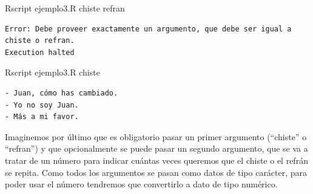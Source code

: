 \documentclass[
]{book}
\newenvironment{Shaded}{\begin{snugshade}}{\end{snugshade}}
\newcommand{\ExtensionTok}[1]{#1}
\newcommand{\NormalTok}[1]{#1}
\begin{document}
\begin{Shaded}
\begin{Highlighting}[]
\ExtensionTok{Rscript}\NormalTok{ ejemplo3.R chiste refran}
\end{Highlighting}
\end{Shaded}

\begin{verbatim}
Error: Debe proveer exactamente un argumento, que debe ser igual a chiste o refran.
Execution halted
\end{verbatim}

\begin{Shaded}
\begin{Highlighting}[]
\ExtensionTok{Rscript}\NormalTok{ ejemplo3.R chiste}
\end{Highlighting}
\end{Shaded}

\begin{verbatim}
- Juan, cómo has cambiado.
- Yo no soy Juan.
- Más a mi favor.
\end{verbatim}

Imaginemos por último que es obligatorio pasar un primer argumento (``chiste'' o ``refran'') y que opcionalmente se puede pasar un segundo argumento, que se va a tratar de un número para indicar cuántas veces queremos que el chiste o el refrán se repita. Como todos los argumentos se pasan como datos de tipo carácter, para poder usar el número tendremos que convertirlo a dato de tipo numérico.
\end{document}
